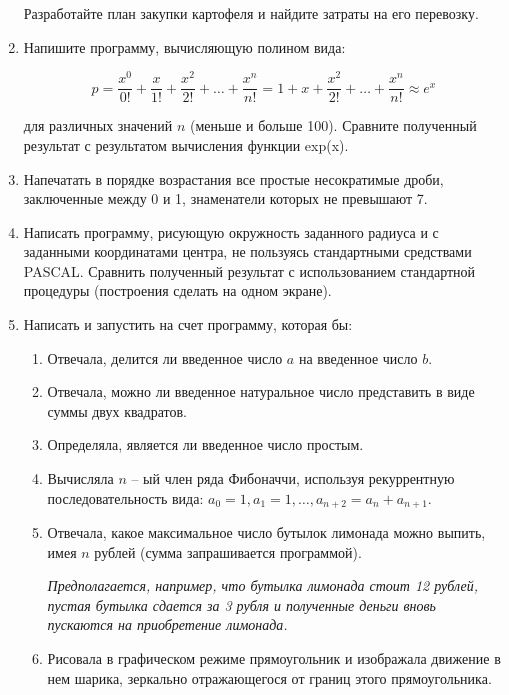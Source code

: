 \begin{enumerate}
Разработайте план закупки картофеля и найдите затраты на его перевозку.

  \item Напишите программу, вычисляющую полином вида:

$$ p = \frac{x^0}{0!}+\frac{x}{1!}+\frac{x^2}{2!}+ \ldots + \frac{x^n}{n!} = 1 + x + \frac{x^2}{2!} + \ldots + \frac{x^n}{n!}  \approx e^x$$


для различных значений $n$ (меньше и больше 100). Сравните полученный результат с результатом вычисления функции exp(x).


  \item Напечатать в порядке возрастания все простые несократимые дроби, заключенные между 0 и 1, знаменатели которых не превышают 7.
    
  \item Написать программу, рисующую окружность заданного радиуса и с заданными координатами центра, не пользуясь стандартными средствами PASCAL. Сравнить полученный результат с использованием стандартной процедуры (построения сделать на одном экране).

  \item Написать и запустить на счет программу, которая бы:
  \begin{enumerate}

    \item Отвечала, делится ли введенное число $a$ на введенное число $b$.

    \item Отвечала, можно ли введенное натуральное число предста­вить в виде суммы двух квадратов.

    \item Определяла, является ли введенное число простым.

    \item Вычисляла $n$ -- ый член ряда Фибоначчи, используя рекур­рентную последовательность вида: 
$a_0 = 1, a_1 = 1, \ldots ,a_{n+2} = a_n + a_{n+1}.$

    \item Отвечала, какое максимальное число бутылок лимонада можно выпить, имея $n$ рублей (сумма запрашивается программой).
    
{\it Предполагается, например, что бутылка лимонада стоит 12 рублей, пустая бутылка сдается за 3 рубля и полученные деньги вновь пускаются на приобретение лимонада.}

    \item Рисовала в графическом режиме прямоугольник и изображала движение в нем шарика, зеркально отражающегося от границ этого прямоугольника.
  \end{enumerate}


\end{enumerate}
